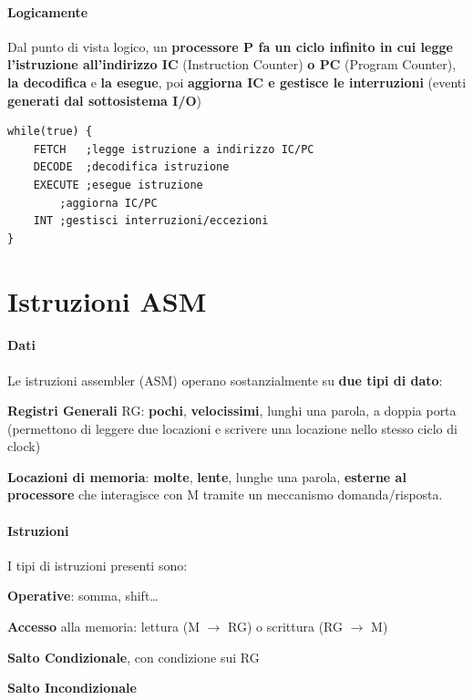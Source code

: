 \documentclass[10pt]{report}
\begin{document}
\paragraph{Logicamente} Dal punto di vista logico, un \textbf{processore P fa un ciclo infinito in cui legge l'istruzione all'indirizzo IC} (Instruction Counter) \textbf{o PC} (Program Counter), \textbf{la decodifica} e \textbf{la esegue}, poi \textbf{aggiorna IC e gestisce le interruzioni} (eventi \textbf{generati dal sottosistema I/O})
\begin{center}
\begin{lstlisting}
while(true) {
	FETCH	;legge istruzione a indirizzo IC/PC
	DECODE	;decodifica istruzione
	EXECUTE	;esegue istruzione
		;aggiorna IC/PC
	INT	;gestisci interruzioni/eccezioni
}
\end{lstlisting}
\end{center}
\pagebreak
\section{Istruzioni ASM}
\paragraph{Dati} Le istruzioni assembler (ASM) operano sostanzialmente su \textbf{due tipi di dato}:
\begin{list}{}{}
	\item \textbf{Registri Generali} RG: \textbf{pochi}, \textbf{velocissimi}, lunghi una parola, a doppia porta (permettono di leggere due locazioni e scrivere una locazione nello stesso ciclo di clock)
	\item \textbf{Locazioni di memoria}: \textbf{molte}, \textbf{lente}, lunghe una parola, \textbf{esterne al processore} che interagisce con M tramite un meccanismo domanda/risposta.
\end{list}
\paragraph{Istruzioni} I tipi di istruzioni presenti sono:
\begin{list}{}{}
	\item \textbf{Operative}: somma, shift\ldots
	\item \textbf{Accesso} alla memoria: lettura (M $\rightarrow$ RG) o scrittura (RG $\rightarrow$ M)
	\item \textbf{Salto Condizionale}, con condizione sui RG
	\item \textbf{Salto Incondizionale}
\end{list}
\end{document}

